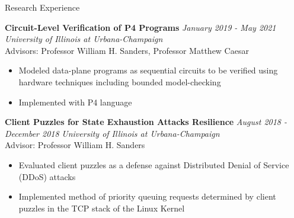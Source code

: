 \documentclass{resume} %
\begin{document}
\begin{rSection}{Research Experience}
		
		{\bf Circuit-Level Verification of P4 Programs} \hfill{\em January 2019 - May 2021}\\
		{\em University of Illinois at Urbana-Champaign}\\
		{Advisors: Professor William H. Sanders, Professor Matthew Caesar}
		\begin{itemize}
			\item Modeled data-plane programs as sequential circuits to be verified using hardware techniques including bounded model-checking
			\item Implemented with P4 language
		\end{itemize}
		
		{\bf Client Puzzles for State Exhaustion Attacks Resilience} \hfill{\em August 2018 - December 2018}
		{\em University of Illinois at Urbana-Champaign}\\
		{Advisor: Professor William H. Sanders}
		\begin{itemize}
			\item Evaluated client puzzles as a defense against Distributed Denial of Service (DDoS) attacks
			\item Implemented method of priority queuing requests determined by client puzzles in the TCP stack of the Linux Kernel
		\end{itemize}
		
	\end{rSection}
\end{document}
